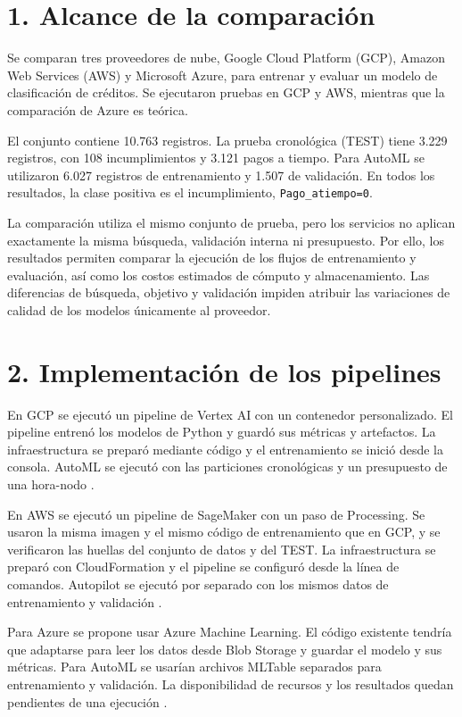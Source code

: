 \section{1. Alcance de la comparación}

Se comparan tres proveedores de nube, Google Cloud Platform (GCP), Amazon Web Services (AWS) y Microsoft Azure, para entrenar y evaluar un modelo de clasificación de créditos. Se ejecutaron pruebas en GCP y AWS, mientras que la comparación de Azure es teórica.

El conjunto contiene 10.763 registros. La prueba cronológica (TEST) tiene 3.229 registros, con 108 incumplimientos y 3.121 pagos a tiempo. Para AutoML se utilizaron 6.027 registros de entrenamiento y 1.507 de validación. En todos los resultados, la clase positiva es el incumplimiento, \nolinkurl{Pago_atiempo=0}.

La comparación utiliza el mismo conjunto de prueba, pero los servicios no aplican exactamente la misma búsqueda, validación interna ni presupuesto. Por ello, los resultados permiten comparar la ejecución de los flujos de entrenamiento y evaluación, así como los costos estimados de cómputo y almacenamiento. Las diferencias de búsqueda, objetivo y validación impiden atribuir las variaciones de calidad de los modelos únicamente al proveedor.

\section{2. Implementación de los pipelines}

En GCP se ejecutó un pipeline de Vertex AI con un contenedor personalizado. El pipeline entrenó los modelos de Python y guardó sus métricas y artefactos. La infraestructura se preparó mediante código y el entrenamiento se inició desde la consola. AutoML se ejecutó con las particiones cronológicas y un presupuesto de una hora-nodo \cite{gcp-pipelines,gcp-automl}.

En AWS se ejecutó un pipeline de SageMaker con un paso de Processing. Se usaron la misma imagen y el mismo código de entrenamiento que en GCP, y se verificaron las huellas del conjunto de datos y del TEST. La infraestructura se preparó con CloudFormation y el pipeline se configuró desde la línea de comandos. Autopilot se ejecutó por separado con los mismos datos de entrenamiento y validación \cite{aws-pipelines,aws-autopilot}.

Para Azure se propone usar Azure Machine Learning. El código existente tendría que adaptarse para leer los datos desde Blob Storage y guardar el modelo y sus métricas. Para AutoML se usarían archivos MLTable separados para entrenamiento y validación. La disponibilidad de recursos y los resultados quedan pendientes de una ejecución \cite{azure-automl}.


